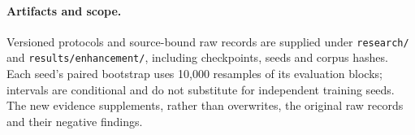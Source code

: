 \paragraph{Artifacts and scope.}
Versioned protocols and source-bound raw records are supplied under
\texttt{research/} and \texttt{results/enhancement/}, including checkpoints,
seeds and corpus hashes. Each seed's paired bootstrap uses 10,000
resamples of its evaluation blocks; intervals are conditional and do not
substitute for independent training seeds. The new evidence supplements,
rather than overwrites, the original raw records and their negative findings.
